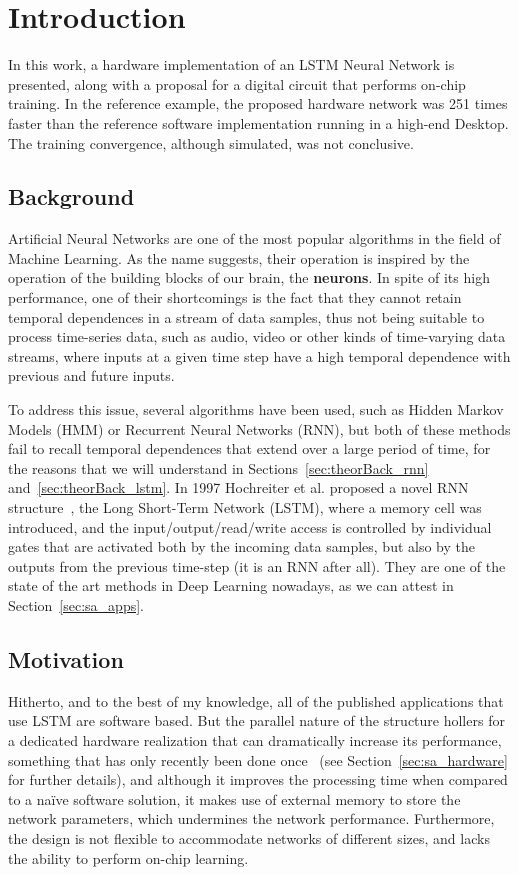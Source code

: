 \chapter{Introduction}\label{chap:intro}

In this work, a hardware implementation of an LSTM Neural Network is presented, along with a proposal for a digital circuit that performs on-chip training.
In the reference example, the proposed hardware network was 251 times faster than the reference software implementation running in a high-end Desktop.
The training convergence, although simulated, was not conclusive.

\section{Background}\label{sec:intro_back}
Artificial Neural Networks are one of the most popular algorithms in the field of Machine Learning. As the name suggests, their operation is inspired by
the operation of the building blocks of our brain, the \textbf{neurons}. In spite of its high performance, one of their shortcomings is the fact that
they cannot retain temporal dependences in a stream of data samples, thus not being suitable to process time-series data, such as audio, video or other
kinds of time-varying data streams, where inputs at a given time step have a high temporal dependence with previous and future inputs.

To address this issue, several algorithms have been used, such as Hidden Markov Models (HMM) or Recurrent Neural Networks (RNN), but both of these methods fail
to recall temporal dependences that extend over a large period of time, for the reasons that we will understand in Sections~\ref{sec:theorBack_rnn} and~\ref{sec:theorBack_lstm}.
In 1997 Hochreiter et al. proposed a novel RNN structure~\cite{Hoch97}, the Long Short-Term Network (LSTM), where a memory cell was introduced, and
the input/output/read/write access is controlled by individual gates that are activated both by the incoming data samples, but also by the outputs
from the previous time-step (it is an RNN after all). They are one of the state of the art methods in Deep Learning nowadays, as we can attest in Section~\ref{sec:sa_apps}.

\section{Motivation}\label{sec:intro_mot}
Hitherto, and to the best of my knowledge, all of the published applications that use LSTM are software based. But the parallel nature of the
structure hollers for a dedicated hardware realization that can dramatically increase its performance, something that has only recently been done
once~\cite{Chang15} (see Section~\ref{sec:sa_hardware} for further details), and although it improves the processing time when compared to a naïve
software solution, it makes use of external memory to store the network parameters, which undermines the network performance. Furthermore, the
design is not flexible to accommodate networks of different sizes, and lacks the ability to perform on-chip learning.

